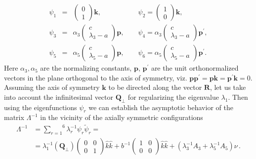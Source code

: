 \documentclass[a4paper,12pt]{article}
\begin{document}
\begin{eqnarray*}
\psi _{1} &=&\left(
\begin{array}{c}
0 \\
1
\end{array}
\right) \boldsymbol{k},\qquad \quad \quad \quad\,\, \psi
_{2}=\left(
\begin{array}{c}
1 \\
0
\end{array}
\right) \boldsymbol{k,} \\
\psi _{3} &=&\alpha _{3}\left(
\begin{array}{c}
c \\
\lambda _{3}-a
\end{array}
\right) \boldsymbol{p},\qquad \psi _{4}=\alpha _{3}\left(
\begin{array}{c}
c \\
\lambda _{3}-a
\end{array}
\right) \boldsymbol{p}^{\prime }, \\
\psi _{5} &=&\alpha _{5}\left(
\begin{array}{c}
c \\
\lambda _{5}-a
\end{array}
\right) \boldsymbol{p},\qquad \psi _{6}=\alpha _{5}\left(
\begin{array}{c}
c \\
\lambda _{5}-a
\end{array}
\right) \boldsymbol{p}^{\prime }.
\end{eqnarray*}
Here $\alpha_3, \alpha_5$ are the normalizing constants,
$\boldsymbol{p}$, $\boldsymbol{p}^{\prime }$ are the unit
orthonormalized vectors in the plane orthogonal to the axis of
symmetry, viz. $\boldsymbol{p} \boldsymbol{p}^{\prime }=
\boldsymbol{p} \boldsymbol{k}=\boldsymbol{p}^{\prime }
\boldsymbol{k}=0$. Assuming the axis of symmetry  $\boldsymbol{k}$
to be directed along the vector $\boldsymbol{R}$, let us take into
account the infinitesimal vector $\boldsymbol{Q}_{\bot }$ for
regularizing the eigenvalue $\lambda_1$. Then using the
eigenfunctions $\psi_r$ we can establish the asymptotic behavior
of the matrix $\Lambda^{-1}$ in the vicinity of the axially
symmetric configurations
\begin{equation}
\begin{split}
\Lambda ^{-1}&=\overset{6}{\underset{r=1}{\sum }}\lambda _{r}^{-1}\psi _{r}%
\tilde{\psi}_{r}= \\
&=\lambda _{1}^{-1}(\boldsymbol{Q}_{\bot })\left(
\begin{array}{cc}
0 & 0 \\
0 & 1
\end{array}
\right) \hat{k}\hat{k}+b^{-1}\left(
\begin{array}{cc}
1 & 0 \\
0 & 0
\end{array}
\right) \hat{k}\hat{k}+(\lambda _{3}^{-1}A_{3}+\lambda _{5}^{-1}A_{5})\nu\,.
\label{I}
\end{split}
\end{equation}
\end{document}
